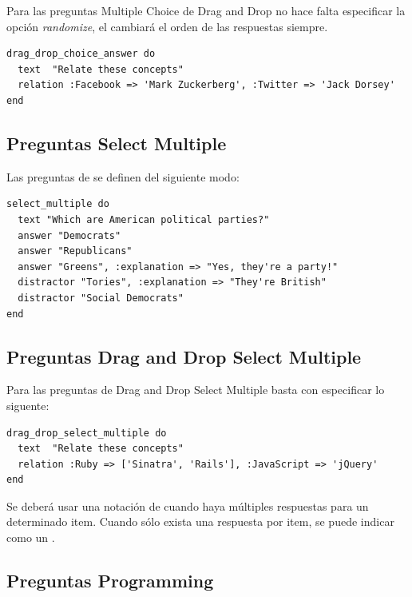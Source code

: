Para las preguntas Multiple Choice de Drag and Drop no hace falta especificar la opci\'on \textit{randomize}, el  cambiar\'a el orden de las 
respuestas siempre.
\begin{lstlisting}
drag_drop_choice_answer do
  text  "Relate these concepts"
  relation :Facebook => 'Mark Zuckerberg', :Twitter => 'Jack Dorsey'
end
\end{lstlisting}

\subsection{Preguntas Select Multiple}
\label{subsec:Apendice2.6}

Las preguntas de  se definen del siguiente modo:
\begin{lstlisting}
select_multiple do
  text "Which are American political parties?"
  answer "Democrats"
  answer "Republicans"
  answer "Greens", :explanation => "Yes, they're a party!"
  distractor "Tories", :explanation => "They're British"
  distractor "Social Democrats"
end
\end{lstlisting}

\subsection{Preguntas Drag and Drop Select Multiple}
\label{subsec:Apendice2.7}

Para las preguntas de Drag and Drop Select Multiple basta con especificar lo siguente:
\begin{lstlisting}
drag_drop_select_multiple do
  text  "Relate these concepts"
  relation :Ruby => ['Sinatra', 'Rails'], :JavaScript => 'jQuery'
end
\end{lstlisting}

Se deber\'a usar una notaci\'on de  cuando haya m\'ultiples respuestas para un determinado item. Cuando s\'olo exista una respuesta por item,
se puede indicar como un .

\subsection{Preguntas Programming}
\label{subsec:Apendice2.8}

